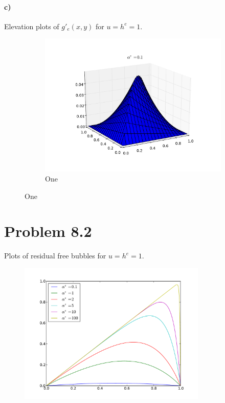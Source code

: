 \documentclass[12pt]{article}
\begin{document}
\paragraph{c)}
Elevation plots of $g'_e(x,y)$ for $u=h^e=1$.
\begin{figure}[h!]
\centering
\begin{subfigure}[c]{0.3\textwidth}
\centering
\includegraphics[width=\textwidth]{surf1e-1.pdf}
\caption{One}
\end{subfigure}
\end{figure}

\clearpage
\newpage

\section*{Problem 8.2}
Plots of residual free bubbles for $u=h^e=1$.
\begin{figure}[h!]
\centering
\includegraphics[width=0.8\textwidth]{bubbles.pdf}
\end{figure}
\end{document}
